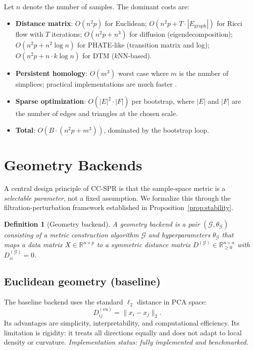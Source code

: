 \documentclass[11pt]{article}
\newtheorem{definition}[theorem]{Definition}
\begin{document}
Let $n$ denote the number of samples.
The dominant costs are:
\begin{itemize}[leftmargin=1.5em]
\item \textbf{Distance matrix}: $O(n^2 p)$ for Euclidean; $O(n^2 p + T \cdot |E_{\text{graph}}|)$ for Ricci flow with $T$ iterations; $O(n^2 p + n^3)$ for diffusion (eigendecomposition); $O(n^2 p + n^2 \log n)$ for PHATE-like (transition matrix and log); $O(n^2 p + n \cdot k \log n)$ for DTM ($k$NN-based).
\item \textbf{Persistent homology}: $O(m^3)$ worst case where $m$ is the number of simplices; practical implementations are much faster \cite{gudhi2014}.
\item \textbf{Sparse optimization}: $O(|E|^2 \cdot |F|)$ per bootstrap, where $|E|$ and $|F|$ are the number of edges and triangles at the chosen scale.
\item \textbf{Total}: $O(B \cdot (n^2 p + m^3))$, dominated by the bootstrap loop.
\end{itemize}

\section{Geometry Backends}
\label{sec:backends}

A central design principle of CC-SPR is that the sample-space metric is a \emph{selectable parameter}, not a fixed assumption.
We formalize this through the filtration-perturbation framework established in Proposition~\ref{prop:stability}.

\begin{definition}[Geometry backend]\label{def:backend}
A \emph{geometry backend} is a pair $(\mathcal{G}, \theta_{\mathcal{G}})$ consisting of a metric construction algorithm $\mathcal{G}$ and hyperparameters $\theta_{\mathcal{G}}$ that maps a data matrix $X \in \mathbb{R}^{n \times p}$ to a symmetric distance matrix $D^{(\mathcal{G})} \in \mathbb{R}_{\ge 0}^{n \times n}$ with $D^{(\mathcal{G})}_{ii} = 0$.
\end{definition}

\subsection{Euclidean geometry (baseline)}

The baseline backend uses the standard $\ell_2$ distance in PCA space:
\[
D^{(\text{eu})}_{ij} = \|x_i - x_j\|_2.
\]
Its advantages are simplicity, interpretability, and computational efficiency.
Its limitation is rigidity: it treats all directions equally and does not adapt to local density or curvature.
\emph{Implementation status: fully implemented and benchmarked.}
\end{document}
